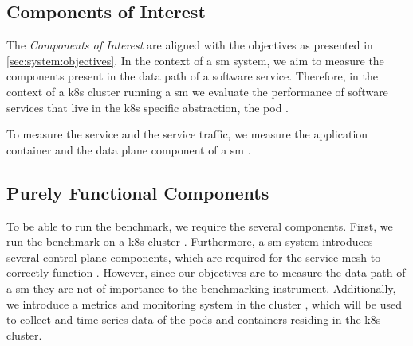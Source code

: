\subsection{Components of Interest}
\label{sec:system:sut:components-interest}

The \textit{Components of Interest} are aligned with the objectives as presented in \cref{sec:system:objectives}. In the context of a \gls{sm} system, we aim to measure the components present in the data path of a software service. Therefore, in the context of a \gls{k8s} cluster running a \gls{sm} we evaluate the performance of software services that live in the \gls{k8s} specific abstraction, the \gls{pod} .

To measure the service and the service traffic, we measure the application container  and the data plane component of a \gls{sm} .

\subsection{Purely Functional Components}
\label{sec:system:sut:components-functional}

To be able to run the benchmark, we require the several components. First, we run the benchmark on a \gls{k8s} cluster . Furthermore, a \gls{sm} system introduces several control plane components, which are required for the service mesh to correctly function . However, since our objectives are to measure the data path of a \gls{sm} they are not of importance to the benchmarking instrument. Additionally, we introduce a metrics and monitoring system in the cluster , which will be used to collect and time series data of the pods and containers residing in the \gls{k8s} cluster.